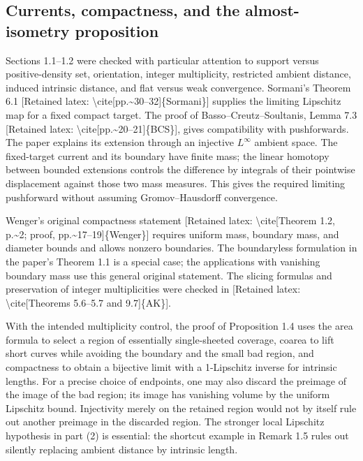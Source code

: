 \documentclass[10pt]{article}
\begin{document}
\subsection*{Currents, compactness, and the almost-isometry proposition}
Sections 1.1–1.2 were checked with particular attention to support versus positive-density set, orientation, integer multiplicity, restricted ambient distance, induced intrinsic distance, and flat versus weak convergence. Sormani’s Theorem 6.1 [Retained latex: \textbackslash{}cite[pp.\textasciitilde{}30--32]\{Sormani\}] supplies the limiting Lipschitz map for a fixed compact target. The proof of Basso–Creutz–Soultanis, Lemma 7.3 [Retained latex: \textbackslash{}cite[pp.\textasciitilde{}20--21]\{BCS\}], gives compatibility with pushforwards. The paper explains its extension through an injective \(L^\infty\) ambient space. The fixed-target current and its boundary have finite mass; the linear homotopy between bounded extensions controls the difference by integrals of their pointwise displacement against those two mass measures. This gives the required limiting pushforward without assuming Gromov–Hausdorff convergence.\par
Wenger’s original compactness statement [Retained latex: \textbackslash{}cite[Theorem 1.2, p.\textasciitilde{}2; proof, pp.\textasciitilde{}17--19]\{Wenger\}] requires uniform mass, boundary mass, and diameter bounds and allows nonzero boundaries. The boundaryless formulation in the paper’s Theorem 1.1 is a special case; the applications with vanishing boundary mass use this general original statement. The slicing formulas and preservation of integer multiplicities were checked in [Retained latex: \textbackslash{}cite[Theorems 5.6--5.7 and 9.7]\{AK\}].\par
With the intended multiplicity control, the proof of Proposition 1.4 uses the area formula to select a region of essentially single-sheeted coverage, coarea to lift short curves while avoiding the boundary and the small bad region, and compactness to obtain a bijective limit with a 1-Lipschitz inverse for intrinsic lengths. For a precise choice of endpoints, one may also discard the preimage of the image of the bad region; its image has vanishing volume by the uniform Lipschitz bound. Injectivity merely on the retained region would not by itself rule out another preimage in the discarded region. The stronger local Lipschitz hypothesis in part (2) is essential: the shortcut example in Remark 1.5 rules out silently replacing ambient distance by intrinsic length.\par
\end{document}
